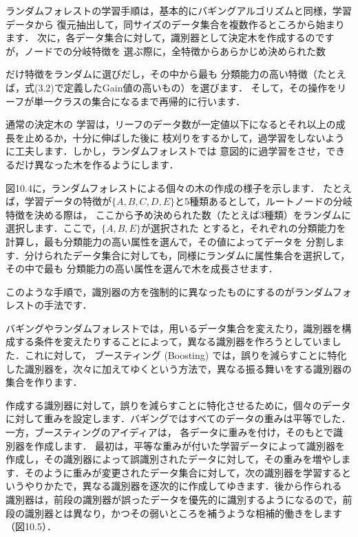 
ランダムフォレストの学習手順は，基本的にバギングアルゴリズムと同様，学習データから
復元抽出して，同サイズのデータ集合を複数作るところから始まります．
次に，各データ集合に対して，識別器として決定木を作成するのですが，ノードでの分岐特徴を
選ぶ際に，全特徴からあらかじめ決められた数

だけ特徴をランダムに選びだし，その中から最も
分類能力の高い特徴（たとえば，式(3.2)で定義したGain値の高いもの）を選びます．
そして，その操作をリーフが単一クラスの集合になるまで再帰的に行います．


通常の決定木の
学習は，リーフのデータ数が一定値以下になるとそれ以上の成長を止めるか，十分に伸ばした後に
枝刈りをするかして，過学習をしないように工夫します．しかし，ランダムフォレストでは
意図的に過学習をさせ，できるだけ異なった木を作るようにします．


図10.4に，ランダムフォレストによる個々の木の作成の様子を示します．
たとえば，学習データの特徴が$\{A,B,C,D,E\}$と5種類あるとして，ルートノードの分岐特徴を決める際は，
ここから予め決められた数（たとえば3種類）をランダムに選択します．ここで，$\{A,B,E\}$が選択された
とすると，それぞれの分類能力を計算し，最も分類能力の高い属性を選んで，その値によってデータを
分割します．分けられたデータ集合に対しても，同様にランダムに属性集合を選択して，その中で最も
分類能力の高い属性を選んで木を成長させます．


このような手順で，識別器の方を強制的に異なったものにするのがランダムフォレストの手法です．


バギングやランダムフォレストでは，用いるデータ集合を変えたり，識別器を構成する条件を変えたりすることによって，異なる識別器を作ろうとしていました．これに対して，
ブースティング (Boosting) 
では，誤りを減らすことに特化した識別器を，次々に加えてゆくという方法で，異なる振る舞いをする識別器の集合を作ります．


作成する識別器に対して，誤りを減らすことに特化させるために，個々のデータに対して重みを設定します．バギングではすべてのデータの重みは平等でした．
一方，ブースティングのアイディアは，
各データに重みを付け，そのもとで識別器を作成します．
最初は，平等な重みが付いた学習データによって識別器を作成し，その識別器によって誤識別されたデータに対して，その重みを増やします．そのように重みが変更されたデータ集合に対して，次の識別器を学習するというやりかたで，異なる識別器を逐次的に作成してゆきます．後から作られる
識別器は，前段の識別器が誤ったデータを優先的に識別するようになるので，前段の識別器とは異なり，かつその弱いところを補うような相補的働きをします（図10.5）．

